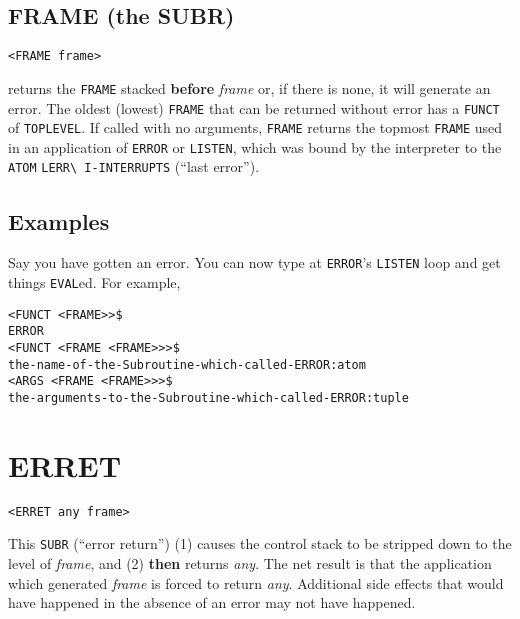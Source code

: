 \documentclass[a4paper]{scrbook}
\begin{document}
\subsection{FRAME (the SUBR)}\label{frame-the-subr}

\begin{verbatim}
<FRAME frame>
\end{verbatim}

 returns the \texttt{FRAME} stacked \textbf{before} \emph{frame} or, if there is none, it will
generate an error. The oldest (lowest) \texttt{FRAME} that can be returned without error has a \texttt{FUNCT} of
\texttt{TOPLEVEL}. If called with no arguments, \texttt{FRAME} returns the topmost
\texttt{FRAME} used in an application of \texttt{ERROR} or \texttt{LISTEN}, which was bound by the interpreter to the
\texttt{ATOM} \texttt{LERR\textbackslash{}\ I-INTERRUPTS} (``last error'').

\subsection{Examples}\label{examples-4}

Say you have gotten an error. You can now type at \texttt{ERROR}'s \texttt{LISTEN} loop and get things \texttt{EVAL}ed. For
example,

\begin{verbatim}
<FUNCT <FRAME>>$
ERROR
<FUNCT <FRAME <FRAME>>>$
the-name-of-the-Subroutine-which-called-ERROR:atom
<ARGS <FRAME <FRAME>>>$
the-arguments-to-the-Subroutine-which-called-ERROR:tuple
\end{verbatim}

\section{ERRET}\label{erret}

\begin{verbatim}
<ERRET any frame>
\end{verbatim}

 This \texttt{SUBR} (``error return'') (1) causes the control stack to be stripped down to the
level of \emph{frame}, and (2) \textbf{then} returns \emph{any}. The net result is that the application which generated
\emph{frame} is forced to return \emph{any}. Additional side effects that would have happened in the absence of an error
may not have happened.
\end{document}
